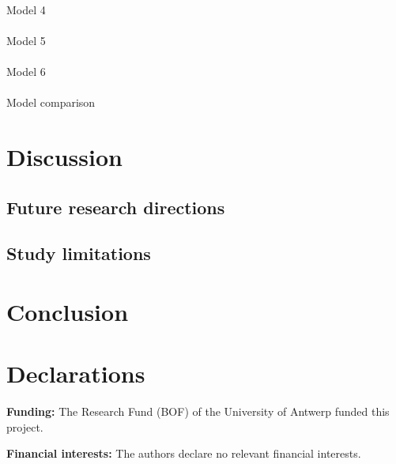\documentclass[
  authoryear,
  review,
  1p]{elsarticle}
\makeatletter
\let\oldparagraph\paragraph
\renewcommand{\paragraph}{
    \@ifstar
      \xxxParagraphStar
      \xxxParagraphNoStar
  }
\newcommand{\xxxParagraphStar}[1]{\oldparagraph*{#1}\mbox{}}
\newcommand{\xxxParagraphNoStar}[1]{\oldparagraph{#1}\mbox{}}
\makeatother
\begin{document}
\paragraph{Model 4}\label{sec-results_modeling_2_4}

\paragraph{Model 5}\label{sec-results_modeling_2_5}

\paragraph{Model 6}\label{sec-results_modeling_2_6}

\paragraph{Model comparison}\label{sec-results_modeling_2_7}

\section{Discussion}\label{sec-discussion}

\subsection{Future research directions}\label{sec-discussion_RD}

\subsection{Study limitations}\label{sec-discussion_limitations}

\section{Conclusion}\label{sec-conclusion}

\newpage{}

\section*{Declarations}\label{declarations}

\textbf{Funding:} The Research Fund (BOF) of the University of Antwerp
funded this project.

\textbf{Financial interests:} The authors declare no relevant financial
interests.
\end{document}
